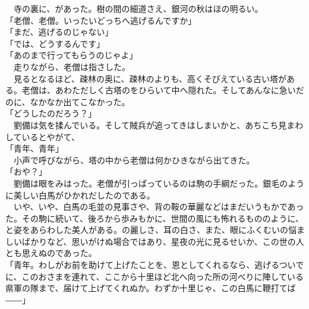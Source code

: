 \documentclass[
  paper=a5,
  fontsize=10pt,
  jafontsize=9.5pt,
  tate,                  %
  open_bracket_pos=nibu, %
]{jlreq}
\begin{document}
　寺の裏に、があった。樹の間の細道さえ、銀河の秋はほの明るい。\\


「老僧、老僧。いったいどっちへ逃げるんですか」\\


「まだ、逃げるのじゃない」\\


「では、どうするんです」\\


「あのまで行ってもらうのじゃよ」\\


　走りながら、老僧は指さした。\\


　見るとなるほど、疎林の奥に、疎林のよりも、高くそびえている古い塔がある。老僧は、あわただしく古塔のをひらいて中へ隠れた。そしてあんなに急いだのに、なかなか出てこなかった。\\


「どうしたのだろう？」\\


　劉備は気を揉んでいる。そして賊兵が追ってきはしまいかと、あちこち見まわしているとやがて、\\


「青年、青年」\\


　小声で呼びながら、塔の中から老僧は何かひきながら出てきた。\\


「おや？」\\


　劉備は眼をみはった。老僧が引っぱっているのは駒の手綱だった。銀毛のように美しい白馬がひかれだしたのである。\\


　いや、いや、白馬の毛並の見事さや、背の鞍の華麗などはまだいうもかであった。その駒に続いて、後ろから歩みもかに、世間の風にも怖れるもののように、と姿をあらわした美人がある。の麗しさ、耳の白さ、また、眼にふくむいの悩ましいばかりなど、思いがけぬ場合ではあり、星夜の光に見るせいか、この世の人とも思えぬのであった。\\


「青年。わしがお前を助けて上げたことを、恩としてくれるなら、逃げるついでに、このおさまを連れて、ここから十里ほど北へ向った所の河べりに陣している県軍の隊まで、届けて上げてくれぬか。わずか十里じゃ、この白馬に鞭打てば――」\\
\end{document}
